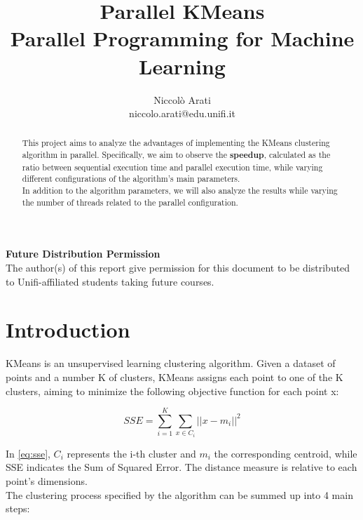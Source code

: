 \documentclass[10pt,twocolumn,letterpaper]{article}
\begin{document}
\title{Parallel KMeans\\
\large Parallel Programming for Machine Learning}

\author{Niccolò Arati\\
niccolo.arati@edu.unifi.it\\
}

\maketitle
\thispagestyle{empty}

\begin{abstract}
This project aims to analyze the advantages of implementing the KMeans clustering algorithm in parallel. Specifically, we aim to observe the \textbf{speedup}, calculated as the ratio between sequential execution time and parallel execution time, while varying different configurations of the algorithm's main parameters.\\ In addition to the algorithm parameters, we will also analyze the results while varying the number of threads related to the parallel configuration.
\end{abstract}

\noindent\large\textbf{Future Distribution Permission}\\
\indent The author(s) of this report give permission for this document to be distributed to Unifi-affiliated students taking future courses.


\section{Introduction}
\label{sec:intro}
KMeans is an unsupervised learning clustering algorithm. Given a dataset of points and a number K of clusters, KMeans assigns each point to one of the K clusters, aiming to minimize the following objective function for each point x:

\begin{equation}
    \label{eq:sse}
    SSE = \sum_{i = 1}^K \sum_{x \in C_i} \lvert \lvert x - m_i \rvert \rvert^2
\end{equation}

In \cref{eq:sse}, $C_i$ represents the i-th cluster and $m_i$ the corresponding centroid, while SSE indicates the Sum of Squared Error. The distance measure is relative to each point's dimensions.\\
The clustering process specified by the algorithm can be summed up into 4 main steps:
\end{document}
